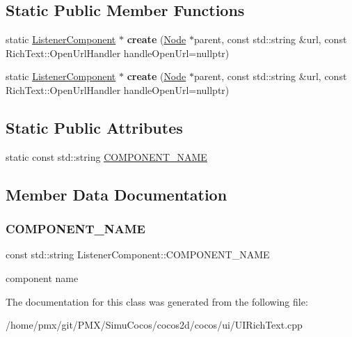 \subsection*{Static Public Member Functions}
\begin{DoxyCompactItemize}
\item 
\mbox{\label{classListenerComponent_a3aa891af952bbfbd6dcef6a4cf763946}} 
static \hyperlink{classListenerComponent}{Listener\+Component} $\ast$ {\bfseries create} (\hyperlink{classNode}{Node} $\ast$parent, const std\+::string \&url, const Rich\+Text\+::\+Open\+Url\+Handler handle\+Open\+Url=nullptr)
\item 
\mbox{\label{classListenerComponent_a3aa891af952bbfbd6dcef6a4cf763946}} 
static \hyperlink{classListenerComponent}{Listener\+Component} $\ast$ {\bfseries create} (\hyperlink{classNode}{Node} $\ast$parent, const std\+::string \&url, const Rich\+Text\+::\+Open\+Url\+Handler handle\+Open\+Url=nullptr)
\end{DoxyCompactItemize}
\subsection*{Static Public Attributes}
\begin{DoxyCompactItemize}
\item 
static const std\+::string \hyperlink{classListenerComponent_a22792b67aa354725e2b71ee86d7d6f60}{C\+O\+M\+P\+O\+N\+E\+N\+T\+\_\+\+N\+A\+ME}
\end{DoxyCompactItemize}


\subsection{Member Data Documentation}
\mbox{\label{classListenerComponent_a22792b67aa354725e2b71ee86d7d6f60}} 
\subsubsection{\texorpdfstring{C\+O\+M\+P\+O\+N\+E\+N\+T\+\_\+\+N\+A\+ME}{COMPONENT\_NAME}}
{\footnotesize\ttfamily const std\+::string Listener\+Component\+::\+C\+O\+M\+P\+O\+N\+E\+N\+T\+\_\+\+N\+A\+ME\hspace{0.3cm}{\ttfamily [static]}}

component name 

The documentation for this class was generated from the following file\+:\begin{DoxyCompactItemize}
\item 
/home/pmx/git/\+P\+M\+X/\+Simu\+Cocos/cocos2d/cocos/ui/U\+I\+Rich\+Text.\+cpp\end{DoxyCompactItemize}
